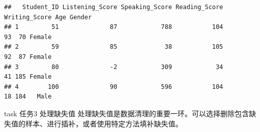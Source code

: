 \documentclass[]{book}
\newenvironment{Shaded}{\begin{snugshade}}{\end{snugshade}}
\newcommand{\CommentTok}[1]{\textcolor[rgb]{0.56,0.35,0.01}{\textit{#1}}}
\newcommand{\DecValTok}[1]{\textcolor[rgb]{0.00,0.00,0.81}{#1}}
\newcommand{\KeywordTok}[1]{\textcolor[rgb]{0.13,0.29,0.53}{\textbf{#1}}}
\newcommand{\NormalTok}[1]{#1}
\newcommand{\OperatorTok}[1]{\textcolor[rgb]{0.81,0.36,0.00}{\textbf{#1}}}
\newcommand{\StringTok}[1]{\textcolor[rgb]{0.31,0.60,0.02}{#1}}
\begin{document}
\begin{Shaded}
\end{Shaded}

\begin{verbatim}
##   Student_ID Listening_Score Speaking_Score Reading_Score Writing_Score Age Gender
## 1         51              87            788           104            93  70 Female
## 2         59              85             38           105            92  87 Female
## 3         80              -2            309            34            41 185 Female
## 4        100              90            596           104            18 184   Male
\end{verbatim}

\begin{infobox}task
任务3 处理缺失值
处理缺失值是数据清理的重要一环。可以选择删除包含缺失值的样本、进行插补，或者使用特定方法填补缺失值。

\end{infobox}
\end{document}

